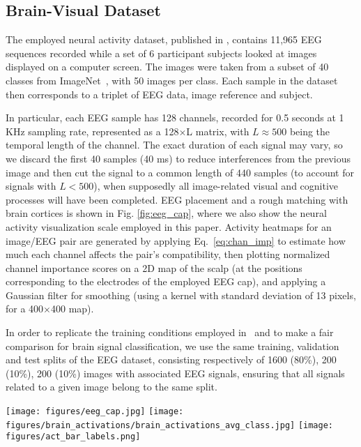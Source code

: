 \documentclass[10pt,journal,compsoc,twocolumn]{IEEEtran}
\begin{document}
\subsection{Brain-Visual Dataset}\label{sec:dataset}
The employed neural activity dataset, published in \cite{Spampinato2016deep}, contains 11,965 EEG sequences recorded while a set of 6 participant subjects looked at images displayed on a computer screen. The images were taken from a subset of 40 classes from ImageNet~\cite{imagenet_cvpr09}, with 50 images per class. Each sample in the dataset then corresponds to a triplet of EEG data, image reference and subject.

In particular, each EEG sample has 128 channels, recorded for 0.5 seconds at 1 KHz sampling rate, represented as a 128$\times$L matrix, with $L\approx 500$ being the temporal length of the channel. The exact duration of each signal may vary, so we discard the first 40 samples (40 ms) to reduce interferences from the previous image and then cut the signal to a common length of 440 samples (to account for signals with $L < 500$), when supposedly all image-related visual and cognitive processes will have been completed.
EEG placement and a rough matching with brain cortices is shown in Fig. \ref{fig:eeg_cap}, where we also show the neural activity visualization scale employed in this paper. Activity heatmaps for an image/EEG pair are generated by applying Eq.~\ref{eq:chan_imp} to estimate how much each channel affects the pair's compatibility, then plotting normalized channel importance scores on a 2D map of the scalp (at the positions corresponding to the electrodes of the employed EEG cap), and applying a Gaussian filter for smoothing (using a kernel with standard deviation of 13 pixels, for a 400$\times$400 map).

In order to replicate the training conditions employed in~\cite{Spampinato2016deep} and to make a fair comparison for brain signal classification, we use the same training, validation and test splits of the EEG dataset, consisting respectively of 1600 (80\%), 200 (10\%), 200 (10\%) images with associated EEG signals, ensuring that all signals related to a given image belong to the same split.

\begin{figure*}
	\centering
	\texttt{[image: figures/eeg\_cap.jpg]} \hspace{0.1cm}
	\texttt{[image: figures/brain\_activations/brain\_activations\_avg\_class.jpg]}
	\texttt{[image: figures/act\_bar\_labels.png]}
	\caption{\textbf{Mapping between EEG channels and brain cortices.}	(Left) EEG channel placement and corresponding brain cortices (background image source : Brain Products GmbH, Gilching, Germany). We used a 128-channel EEG, each channel in the figure is identified by a prefix letter referring to brain cortex (Fp: frontal, T: temporal, C: central, P: parietal, O: occipital) and a number indicating the electrode. (Right) Neural activation visualization --- top view of the scalp --- employed in this paper. A detailed mapping between EEG channels and brain cortices can be found in \cite{pmid11275545}.}
	\label{fig:eeg_cap}
\end{figure*}
\end{document}
